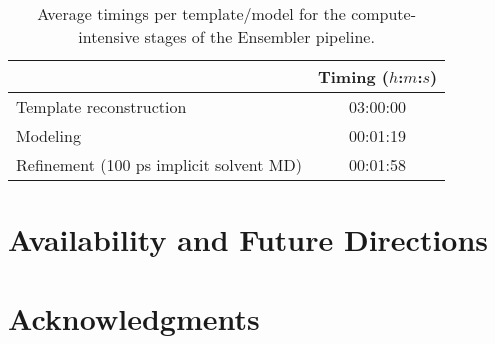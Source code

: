 \documentclass[aps,pre,twocolumn,nofootinbib,superscriptaddress,linenumbers]{revtex4-1}
\begin{document}
\begin{table}
\begin{tabular}{l|c}

    & Timing ($h$:$m$:$s$) \\
    \hline
    Template reconstruction & 03:00:00 \\
    Modeling & 00:01:19 \\
    Refinement (100 ps implicit solvent MD) & 00:01:58 \\

\end{tabular}
\label{tab:timings}
\caption{Average timings per template/model for the compute-intensive stages of the Ensembler pipeline.}
\end{table}

\section{Availability and Future Directions}
\label{section:availability}

\section{Acknowledgments}
\label{section:acknowledgments}


% 

\end{document}
